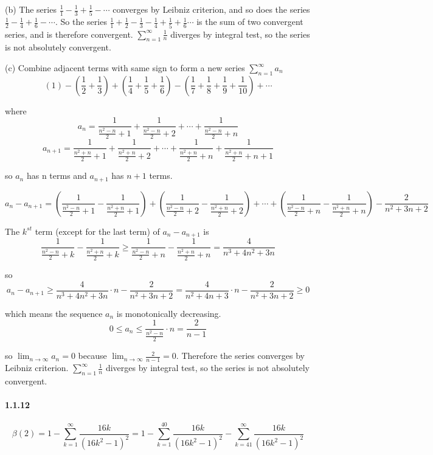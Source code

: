 \documentclass[a4paper]{article}
\begin{document}
(b)  The series $\frac{1}{1}-\frac{1}{3}+\frac{1}{5}-\cdots$ converges by Leibniz criterion, and so does the series  $\frac{1}{2}-\frac{1}{4}+\frac{1}{6}-\cdots$. So the series  $\frac{1}{1}+\frac{1}{2}-\frac{1}{3}-\frac{1}{4}+\frac{1}{5}+\frac{1}{6}\cdots$ is the sum of two convergent series, and is therefore convergent.
$\sum_{n=1}^\infty\frac{1}{n}$ diverges by integral test, so the series is not absolutely convergent.
\medskip

(c) 
Combine adjacent terms with same sign to form a new series $\sum_{n=1}^\infty a_n$
\[(1)-(\frac{1}{2}+\frac{1}{3})+(\frac{1}{4}+\frac{1}{5}+\frac{1}{6})-(\frac{1}{7}+\frac{1}{8}+\frac{1}{9}+\frac{1}{10})+\cdots\]

where \[a_n=\frac{1}{\frac{n^2-n}{2}+1}+\frac{1}{\frac{n^2-n}{2}+2}+\cdots+\frac{1}{\frac{n^2-n}{2}+n}\]
\[a_{n+1}=\frac{1}{\frac{n^2+n}{2}+1}+\frac{1}{\frac{n^2+n}{2}+2}+\cdots+\frac{1}{\frac{n^2+n}{2}+n}+\frac{1}{\frac{n^2+n}{2}+n+1}\]

so $a_n$ has n terms and $a_{n+1}$ has $n+1$ terms.

\[a_{n}-a_{n+1}=(\frac{1}{\frac{n^2-n}{2}+1}-\frac{1}{\frac{n^2+n}{2}+1})+(\frac{1}{\frac{n^2-n}{2}+2}-\frac{1}{\frac{n^2+n}{2}+2})+\cdots+(\frac{1}{\frac{n^2-n}{2}+n}-\frac{1}{\frac{n^2+n}{2}+n})-\frac{2}{n^2+3n+2}\]

The $k^{st}$ term (except for the last term) of $a_{n}-a_{n+1}$ is
\[\frac{1}{\frac{n^2-n}{2}+k}-\frac{1}{\frac{n^2+n}{2}+k}\geq\frac{1}{\frac{n^2-n}{2}+n}-\frac{1}{\frac{n^2+n}{2}+n}=\frac{4}{n^3+4n^2+3n}\]

so \[a_{n}-a_{n+1}\geq\frac{4}{n^3+4n^2+3n}\cdot n-\frac{2}{n^2+3n+2}=\frac{4}{n^2+4n+3}\cdot n-\frac{2}{n^2+3n+2}\geq0\]

which means the sequence $a_n$ is monotonically decreasing.
\[0\leq a_n\leq\frac{1}{\frac{n^2-n}{2}}\cdot n=\frac{2}{n-1}\]

so $\lim_{n\to\infty}a_n=0$ because $\lim_{n\to\infty}\frac{2}{n-1}=0$. Therefore the series converges by Leibniz criterion.
$\sum_{n=1}^\infty\frac{1}{n}$ diverges by integral test, so the series is not absolutely convergent.





\paragraph{1.1.12}
\[\beta(2)=1-\sum_{k=1}^\infty\frac{16k}{(16k^2-1)^2}=1-\sum_{k=1}^{40}\frac{16k}{(16k^2-1)^2}-\sum_{k=41}^\infty\frac{16k}{(16k^2-1)^2}\]
\end{document}
